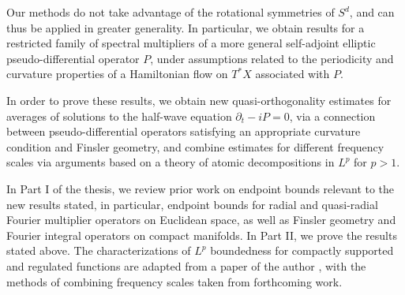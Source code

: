 
%
% 
%


Our methods do not take advantage of the rotational symmetries of $S^d$, and can thus be applied in greater generality. In particular, we obtain results for a restricted family of spectral multipliers of a more general self-adjoint elliptic pseudo-differential operator $P$, under  assumptions related to the periodicity and curvature properties of a Hamiltonian flow on $T^* X$ associated with $P$.

In order to prove these results, we obtain new quasi-orthogonality estimates for averages of solutions to the half-wave equation $\partial_t - i P = 0$, via a connection between pseudo-differential operators satisfying an appropriate curvature condition and Finsler geometry, and combine estimates for different frequency scales via arguments based on a theory of atomic decompositions in $L^p$ for $p > 1$.

In Part I of the thesis, we review prior work on endpoint bounds relevant to the new results stated, in particular, endpoint bounds for radial and quasi-radial Fourier multiplier operators on Euclidean space, as well as Finsler geometry and Fourier integral operators on compact manifolds. In Part II, we prove the results stated above. The characterizations of $L^p$ boundedness for compactly supported and regulated functions are adapted from a paper of the author \cite{Denson}, with the methods of combining frequency scales taken from forthcoming work.